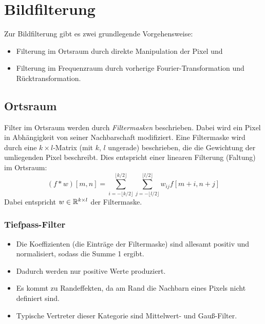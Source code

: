 	\section{Bildfilterung}
		Zur Bildfilterung gibt es zwei grundlegende Vorgehensweise:
		\begin{itemize}
			\item Filterung im Ortsraum durch direkte Manipulation der Pixel und
			\item Filterung im Frequenzraum durch vorherige Fourier-Transformation und Rücktransformation.
		\end{itemize}

		\subsection{Ortsraum}
			Filter im Ortsraum werden durch \emph{Filtermasken} beschrieben. Dabei wird ein Pixel in Abhängigkeit von seiner Nachbarschaft modifiziert. Eine Filtermaske wird durch eine \( k \times l \)-Matrix (mit \(k\), \(l\) ungerade) beschrieben, die die Gewichtung der umliegenden Pixel beschreibt. Dies entspricht einer linearen Filterung (Faltung) im Ortsraum:
			\begin{equation*}
				(f \ast w)[m, n] = \sum_{i = -\lfloor k/2 \rfloor}^{\lfloor k/2 \rfloor} \sum_{j = -\lfloor l/2 \rfloor}^{\lfloor l/2 \rfloor} w_{ij} f[m + i, n + j]
			\end{equation*}
			Dabei entspricht \( w \in \mathbb{R}^{k \times l} \) der Filtermaske.

			\subsubsection{Tiefpass-Filter}
				\begin{itemize}
					\item Die Koeffizienten (\dh die Einträge der Filtermaske) sind allesamt positiv und normalisiert, sodass die Summe \num{1} ergibt.
					\item Dadurch werden nur positive Werte produziert.
					\item Es kommt zu Randeffekten, da am Rand die Nachbarn eines Pixels nicht definiert sind.
					\item Typische Vertreter dieser Kategorie sind Mittelwert- und Gauß-Filter.
				\end{itemize}

